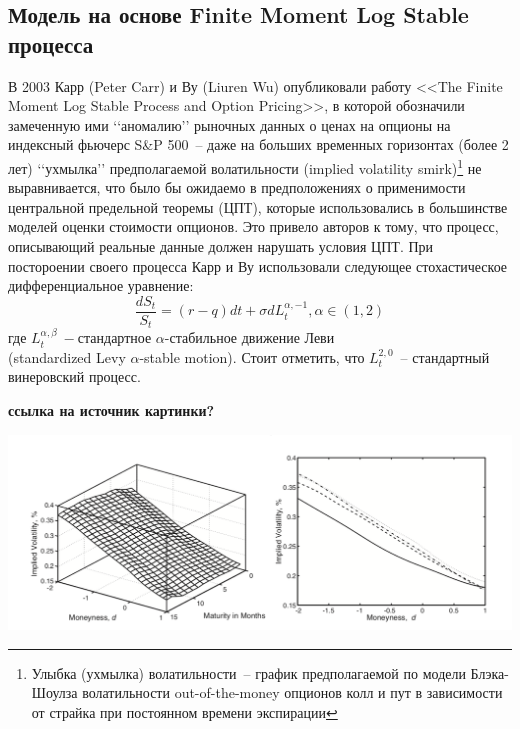 \documentclass[oneside, final, 12pt]{article}
\begin{document}
\subsection{Модель на основе Finite Moment Log Stable процесса}
В 2003 Карр (Peter Carr) и Ву (Liuren Wu) опубликовали работу <<The Finite Moment Log Stable Process and Option Pricing>>, в которой обозначили замеченную ими \lq\lq{}аномалию\rq\rq{} рыночных данных о ценах на опционы на индексный фьючерс S\&P 500~-- даже на больших временных горизонтах (более 2 лет) \lq\lq{}ухмылка\rq\rq{} предполагаемой волатильности (implied volatility smirk)\footnote{Улыбка (ухмылка) волатильности~-- график предполагаемой по модели Блэка-Шоулза волатильности out-of-the-money опционов колл и пут в зависимости от страйка при постоянном времени экспирации} не выравнивается, что было бы ожидаемо в предположениях о применимости центральной предельной теоремы (ЦПТ), которые использовались в большинстве моделей оценки стоимости опционов. Это привело авторов к тому, что процесс, описывающий реальные данные должен нарушать условия ЦПТ. При постороении своего процесса Карр и Ву использовали следующее стохастическое дифференциальное уравнение: 
\[ \frac{dS_t}{S_t} = (r - q)dt + \sigma dL_t^{\alpha, -1}, \alpha \in (1, 2)\] где \( L_t^{\alpha, \beta}~-\)стандартное $\alpha$-стабильное движение Леви\\(standardized
Levy $\alpha$-stable motion)\cite{Levy:paper}. Стоит отметить, что $L_t^{2, 0}$~-- стандартный винеровский процесс. 

\textbf{ ссылка на источник картинки?}

\begin{center}
  \includegraphics[width=1\linewidth]{img/implied_volatility.png}
\end{center}


\newpage
\end{document}

